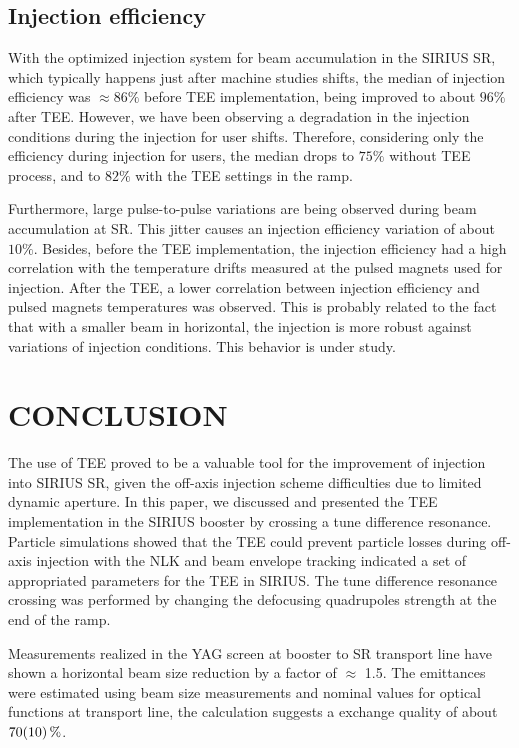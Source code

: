 \documentclass[a4paper,
               keeplastbox,   %
              nospread,     %
               ]{jacow}
\begin{document}
\subsection{Injection efficiency}

With the optimized injection system for beam accumulation in the SIRIUS SR, which typically happens just after machine studies shifts, the median of injection efficiency was $\approx 86 \%$ before TEE implementation, being improved to about $96\%$ after TEE. However, we have been observing a degradation in the injection conditions during the injection for user shifts. Therefore, considering only the efficiency during injection for users, the median drops to $75 \%$ without TEE process, and to $82\%$ with the TEE settings in the ramp.

Furthermore, large pulse-to-pulse variations are being observed during beam accumulation at SR. This jitter causes an injection efficiency variation of about $10\%$. Besides, before the TEE implementation, the injection efficiency had a high correlation with the temperature drifts measured at the pulsed magnets used for injection. After the TEE, a lower correlation between injection efficiency and pulsed magnets temperatures was observed. This is probably related to the fact that with a smaller beam in horizontal, the injection is more robust against variations of injection conditions. This behavior is under study.

\section{CONCLUSION}

The use of TEE proved to be a valuable tool for the improvement of injection into SIRIUS SR, given the off-axis injection scheme difficulties due to limited dynamic aperture. In this paper, we discussed and presented the TEE implementation in the SIRIUS booster by crossing a tune difference resonance. Particle simulations showed that the TEE could prevent particle losses during off-axis injection with the NLK and beam envelope tracking indicated a set of appropriated parameters for the TEE in SIRIUS. The tune difference resonance crossing was performed by changing the defocusing quadrupoles strength at the end of the ramp.

Measurements realized in the YAG screen at booster to SR transport line have shown a horizontal beam size reduction by a factor of $\approx$ 1.5. The emittances were estimated using beam size measurements and nominal values for optical functions at transport line, the calculation suggests a exchange quality of about $\SI{70 \pm 10}{\%}$.
\end{document}
